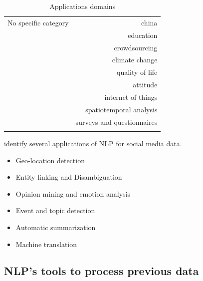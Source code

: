 \begin{center}
\begin{longtable}{ rr }
        \hline
        No specific category  & china                           \\
                              & education                       \\
                              & crowdsourcing                   \\
                              & climate change                  \\
                              & quality of life                 \\
                              & attitude                        \\
                              & internet of things              \\
                              & spatiotemporal analysis         \\
                              & surveys and questionnaires      \\

        \hline
        \caption{Applications domains}
        \label{table:application-domains}
    \end{longtable}
\end{center}

\cite{farzindarNaturalLanguageProcessing2017} identify several applications of NLP for social media data.
\begin{itemize}
    \item Geo-location detection
    \item Entity linking and Disambiguation
    \item Opinion mining and emotion analysis
    \item Event and topic detection
    \item Automatic summarization
    \item Machine translation
\end{itemize}

\subsection{NLP's tools to process previous data}

